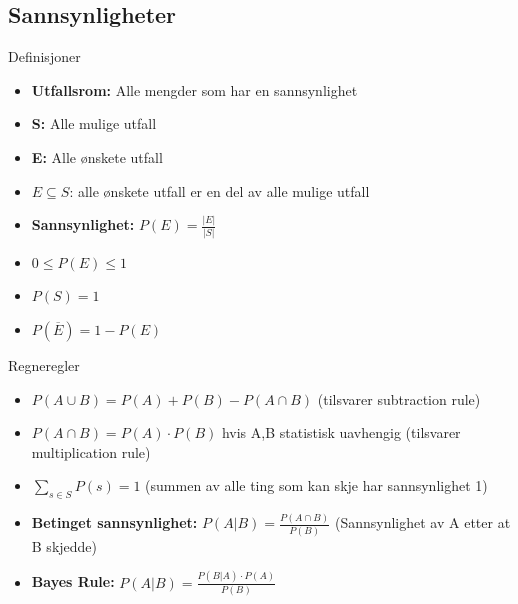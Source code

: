 \subsection{Sannsynligheter}
\begin{frame}{Definisjoner}
\begin{itemize}[<+->]
\item \textbf{Utfallsrom: }Alle mengder som har en sannsynlighet
\item \textbf{S: }Alle mulige utfall
\item \textbf{E: }Alle ønskete utfall
\item $E \subseteq S$: alle ønskete utfall er en del av alle mulige utfall
\item \textbf{Sannsynlighet: }$P(E)=\frac{|E|}{|S|}$
\item $0 \leq P(E) \leq 1$
\item $P(S)=1$
\item $P(\overline{E})=1-P(E)$
\end{itemize}
\end{frame}

\begin{frame}{Regneregler}
\begin{itemize}[<+->]
\item $P(A\cup B)=P(A)+P(B)-P(A\cap B)$ (tilsvarer subtraction rule)
\item $P(A\cap B)=P(A)\cdot P(B)$ hvis A,B statistisk uavhengig (tilsvarer multiplication rule)
\item $\sum_{s\in S} P(s) = 1 $ (summen av alle ting som kan skje har sannsynlighet 1)
\item \textbf{Betinget sannsynlighet: }$P(A|B)=\frac{P(A\cap B)}{P(B)}$ (Sannsynlighet av A etter at B skjedde)
\item \textbf{Bayes Rule: }$P(A|B)=\frac{P(B|A)\cdot P(A)}{P(B)}$
\end{itemize}
\end{frame}

